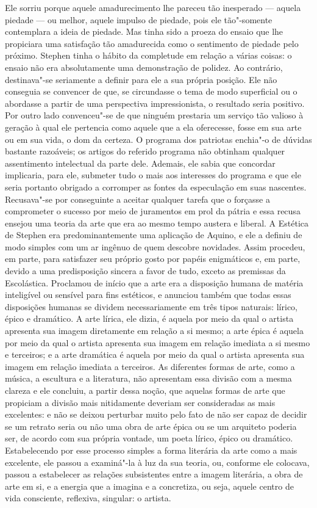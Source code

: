 Ele sorriu porque aquele amadurecimento lhe pareceu tão inesperado ---
aquela piedade --- ou melhor, aquele impulso de piedade, pois ele
tão"-somente contemplara a ideia de piedade.  Mas tinha sido a proeza do
ensaio que lhe propiciara uma satisfação tão amadurecida como o
sentimento de piedade pelo próximo.  Stephen tinha o hábito da
completude em relação a várias coisas: o ensaio não era absolutamente
uma demonstração de polidez.  Ao contrário, destinava"-se seriamente a
definir para ele a sua própria posição.  Ele não conseguia se convencer
de que, se circundasse o tema de modo superficial ou o abordasse a
partir de uma perspectiva impressionista, o resultado seria positivo.
Por outro lado convenceu"-se de que ninguém prestaria um serviço tão
valioso à geração à qual ele pertencia como aquele que a ela
oferecesse, fosse em sua arte ou em sua vida, o dom da certeza.  O
programa dos patriotas enchia"-o de dúvidas bastante razoáveis; os
artigos do referido programa não obtinham qualquer assentimento
intelectual da parte dele.  Ademais, ele sabia que concordar
implicaria, para ele, submeter tudo o mais aos interesses do programa e
que ele seria portanto obrigado a corromper as fontes da especulação em
suas nascentes.  Recusava"-se por conseguinte a aceitar qualquer tarefa
que o forçasse a comprometer o sucesso por meio de juramentos em prol
da pátria e essa recusa ensejou uma teoria da arte que era ao mesmo
tempo austera e liberal.  A Estética de Stephen era predominantemente
\label{uma"-aplicacao} uma aplicação de Aquino, e ele a definiu de modo simples com um ar
ingênuo de quem descobre novidades.  Assim procedeu, em parte, para
satisfazer seu próprio gosto por papéis enigmáticos e, em parte, devido
a uma predisposição sincera a favor de tudo,	
exceto \label{as"-premissas} as premissas da Escolástica.  Proclamou de início que a arte			
era a disposição humana de matéria inteligível ou sensível para fins
estéticos, e anunciou também que todas essas disposições humanas se
dividem necessariamente em três tipos naturais: lírico, épico e
dramático.  A arte lírica, ele dizia, é aquela por meio da qual o
artista apresenta sua imagem diretamente em relação a si mesmo; a arte
épica é aquela por meio da qual o artista apresenta sua imagem em
relação imediata a si mesmo e terceiros; e a arte dramática é aquela
por meio da qual o artista apresenta sua imagem em relação imediata a
terceiros.  As diferentes formas de arte, como a música, a escultura e
a literatura, não apresentam essa divisão com a mesma clareza e ele
concluiu, a partir dessa noção, que aquelas formas de arte que
propiciam a divisão mais nitidamente deveriam ser consideradas as mais
excelentes: e não se deixou perturbar muito pelo fato de não ser capaz
de decidir se um retrato seria ou não uma obra de arte épica ou se um
arquiteto poderia ser, de acordo com sua própria vontade, um poeta
lírico, épico ou dramático.  Estabelecendo por esse processo simples a
forma literária da arte como a mais excelente, ele passou a examiná"-la à
luz da sua teoria, ou, conforme ele colocava, passou a estabelecer as
relações subsistentes entre a imagem literária, a obra de arte em si, e
a energia que a imagina e a concretiza, ou seja, aquele centro de vida
consciente, reflexiva, singular: o artista.

